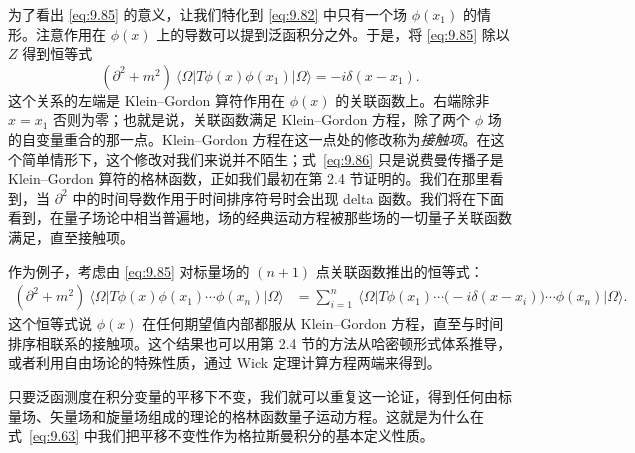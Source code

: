 为了看出 \eqref{eq:9.85} 的意义，让我们特化到 \eqref{eq:9.82} 中只有一个场 $\phi(x_1)$ 的情形。注意作用在 $\phi(x)$ 上的导数可以提到泛函积分之外。于是，将 \eqref{eq:9.85} 除以 $Z$ 得到恒等式
\begin{equation}
  (\partial^2 + m^2)\ \langle\Omega|T\phi(x)\phi(x_1)|\Omega\rangle
  = -i\delta(x-x_1) .
  \label{eq:9.86}
\end{equation}
这个关系的左端是 Klein--Gordon 算符作用在 $\phi(x)$ 的关联函数上。右端除非 $x = x_1$ 否则为零；也就是说，关联函数满足 Klein--Gordon 方程，除了两个 $\phi$ 场的自变量重合的那一点。Klein--Gordon 方程在这一点处的修改称为\emph{接触项}。在这个简单情形下，这个修改对我们来说并不陌生；式~\eqref{eq:9.86} 只是说费曼传播子是 Klein--Gordon 算符的格林函数，正如我们最初在第 2.4 节证明的。我们在那里看到，当 $\partial^2$ 中的时间导数作用于时间排序符号时会出现 delta 函数。我们将在下面看到，在量子场论中相当普遍地，场的经典运动方程被那些场的一切量子关联函数满足，直至接触项。

作为例子，考虑由 \eqref{eq:9.85} 对标量场的 $(n+1)$ 点关联函数推出的恒等式：
\begin{equation}
  \begin{aligned}
    (\partial^2+m^2)\ \langle\Omega|T\phi(x)\phi(x_1)\cdots\phi(x_n)
      |\Omega\rangle
    &= \sum_{i=1}^{n}\ \langle\Omega|T\phi(x_1)\cdots\bigl(
      -i\delta(x-x_i) \bigr)\cdots\phi(x_n)|\Omega\rangle .
  \end{aligned}
  \label{eq:9.87}
\end{equation}
这个恒等式说 $\phi(x)$ 在任何期望值内部都服从 Klein--Gordon 方程，直至与时间排序相联系的接触项。这个结果也可以用第 2.4 节的方法从哈密顿形式体系推导，或者利用自由场论的特殊性质，通过 Wick 定理计算方程两端来得到。

只要泛函测度在积分变量的平移下不变，我们就可以重复这一论证，得到任何由标量场、矢量场和旋量场组成的理论的格林函数量子运动方程。这就是为什么在式~\eqref{eq:9.63} 中我们把平移不变性作为格拉斯曼积分的基本定义性质。

